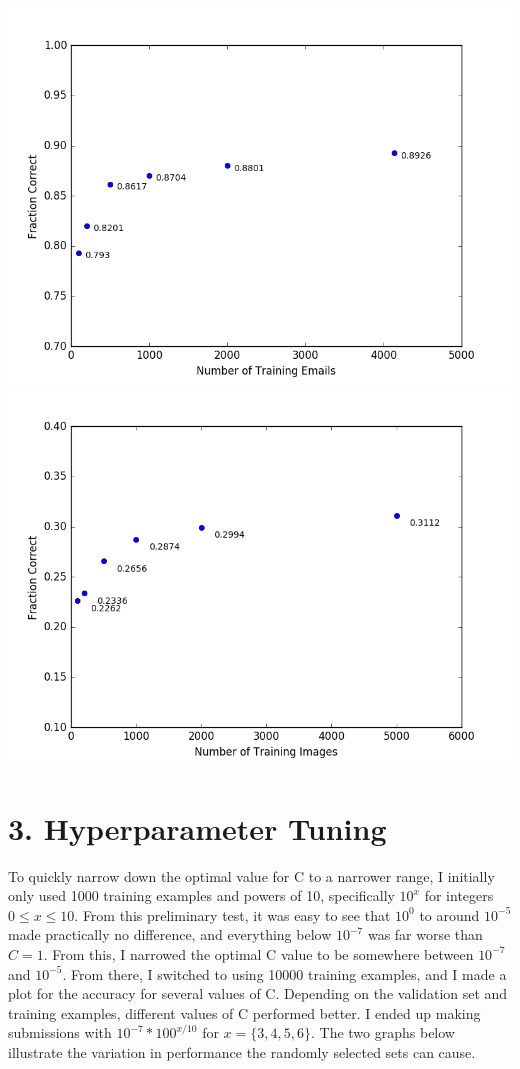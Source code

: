 \documentclass[11pt]{article}
\begin{document}
\includegraphics[scale=.7]{email_plot_2.png}\\

\includegraphics[scale=.7]{images_plot.png}

\newpage

\section*{3. Hyperparameter Tuning}
To quickly narrow down the optimal value for C to a narrower range, I initially only used 1000 training examples and powers of 10, specifically $10^x$ for integers $0 \leq x \leq 10$. From this preliminary test, it was easy to see that $10^0$ to around $10^{-5}$ made practically no difference, and everything below $10^{-7}$ was far worse than $C=1$. From this, I narrowed the optimal C value to be somewhere between $10^{-7}$ and $10^{-5}$. From there, I switched to using 10000 training examples, and I made a plot for the accuracy for several values of C. Depending on the validation set and training examples, different values of C performed better. I ended up making submissions with $10^{-7}*100^{x/10}$ for $x=\{3, 4, 5, 6\}$. The two graphs below illustrate the variation in performance the randomly selected sets can cause.
\end{document}
